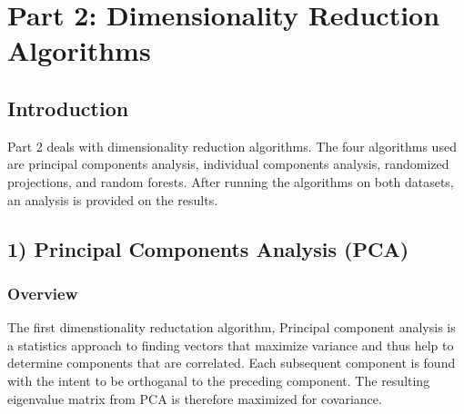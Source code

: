 \documentclass[h]{article}
\begin{document}
 
\section*{Part 2: Dimensionality Reduction Algorithms}
\subsection*{ Introduction}  
Part 2 deals with dimensionality reduction algorithms.  The four algorithms used 
are principal components analysis, individual components analysis, randomized projections, and random 
forests.  After running the algorithms on both datasets, an analysis is provided 
on the results.

\subsection*{1) Principal Components Analysis (PCA)}  
\subsubsection*{Overview}
The first dimenstionality reductation algorithm, Principal component analysis is a statistics approach to finding vectors that 
maximize variance and thus help to determine components that are correlated.  Each subsequent component is found with the intent to be 
orthoganal to the preceding component.  The resulting eigenvalue matrix from PCA 
is therefore maximized for covariance.
\end{document}
